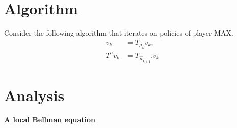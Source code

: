 \documentclass{article}
\begin{document}
\section{Algorithm}

Consider the following algorithm that iterates on policies of player MAX.
\begin{align}
  v_k &= T_{\mu_k}v_k, \\
  T^{n} v_k &= T_{\vec\mu_{k+1}'} v_k
\end{align}


\section{Analysis}


\paragraph{A local Bellman equation}
\end{document}
